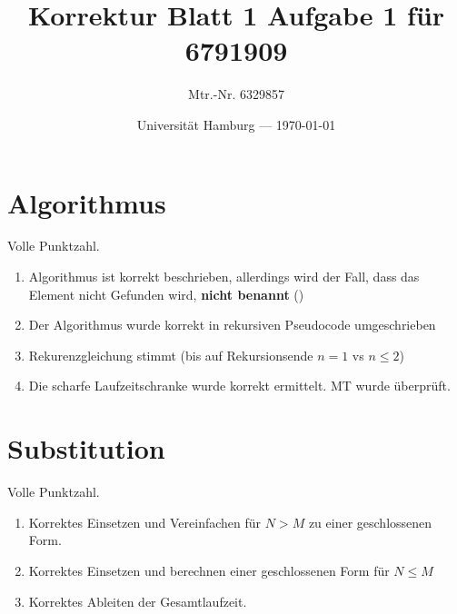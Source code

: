 \documentclass[parskip=half,a4paper]{scrartcl}
\title{Korrektur Blatt 1 Aufgabe 1 für 6791909}
\author{Mtr.-Nr. 6329857}
\date{Universität Hamburg --- \today}
\begin{document}
\maketitle %

\section*{Algorithmus}

Volle Punktzahl.

\begin{enumerate}
    \item Algorithmus ist korrekt beschrieben, allerdings wird der Fall, dass das Element nicht Gefunden wird, \textbf{nicht benannt} (\checkmark)
    \item Der Algorithmus wurde korrekt in rekursiven Pseudocode umgeschrieben \checkmark
    \item Rekurenzgleichung stimmt (bis auf Rekursionsende $n = 1$ vs $n \le 2$) \checkmark
    \item Die scharfe Laufzeitschranke wurde korrekt ermittelt. MT wurde überprüft. \checkmark
\end{enumerate}

\section*{Substitution}



Volle Punktzahl.

\begin{enumerate}
\item Korrektes Einsetzen und Vereinfachen für $N > M$ zu einer geschlossenen Form. \checkmark
\item Korrektes Einsetzen und berechnen einer geschlossenen Form für $N \le M$ \checkmark
\item Korrektes Ableiten der Gesamtlaufzeit. \checkmark
\end{enumerate}
\end{document}
